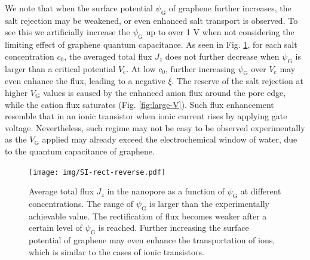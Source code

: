 \documentclass[manuscript=suppinfo,email=true, hyperref=true, keywords=false]{achemso}
\newcommand{\Fig}{Fig.}
\begin{document}
We note that when the surface potential $\psi_{\mathrm{G}}$ of
graphene further increases, the salt rejection may be weakened, or
even enhanced salt transport is observed. To see this we artificially
increase the $\psi_{\mathrm{G}}$ up to over 1 V when not considering
the limiting effect of graphene quantum capacitance. As seen in \Fig{}
\ref{fig:reverse}, for each salt concentration $c_{0}$, the averaged
total flux $J_{z}$ does not further decrease when $\psi_{\mathrm{G}}$
is larger than a critical potential $V_{\mathrm{c}}$. At low $c_{0}$,
further increasing $\psi_{\mathrm{G}}$ over $V_{\mathrm{c}}$ may even
enhance the flux, leading to a negative $\xi$. The reserve of the salt
rejection at higher $V_{\mathrm{G}}$ values is caused by the enhanced
anion flux around the pore edge, while the cation flux saturates
(\Fig{} \ref{fig:large-V}). Such flux enhancement resemble that in an
ionic transistor \cite{Nam_2009,Cheng_2018} when ionic current rises
by applying gate voltage. Nevertheless, such regime may not be easy to
be observed experimentally as the $V_{\mathrm{G}}$ applied may already
exceed the electrochemical window of water, due to the quantum
capacitance of graphene.

\begin{figure}[htbp]
  \centering
  \texttt{[image: img/SI-rect-reverse.pdf]}
  \caption{Average total flux $J_{z}$ in the nanopore as
    a function of $\psi_{\mathrm{G}}$ at different concentrations. The
    range of $\psi_{\mathrm{G}}$ is larger than the experimentally
    achievable value. The rectification of flux becomes weaker after a
    certain level of $\psi_{\mathrm{G}}$ is reached. Further
    increasing the surface potential of graphene may even enhance the
    transportation of ions, which is similar to the cases of ionic
    transistors.}
  \label{fig:reverse}
\end{figure}
\end{document}
